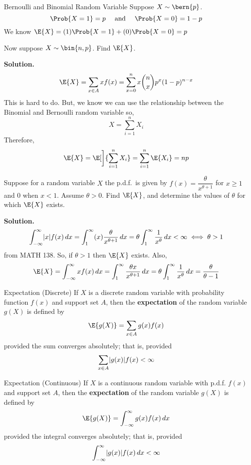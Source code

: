 \begin{Example}{Bernoulli and Binomial Random Variable}{}
    Suppose $ X \sim \bern{p} $.
    \[ \Prob{X=1}=p\quad\text{ and }\quad \Prob{X=0}=1-p \]
    We know $ \E{X}=(1)\Prob{X=1}+(0)\Prob{X=0}=p $

    Now suppose
    $ X \sim \bin{n,p} $. Find $ \E{X} $.

    \textbf{Solution.}
    \[ \E{X}=\sum\limits_{x\in A}x f(x)=\sum\limits_{x=0}^{n} x
        \binom{n}{x}p^x(1-p)^{n-x}  \]
    This is hard to do. But, we know we can use the
    relationship between the Binomial and Bernoulli random variable
    so,
    \[ X=\sum\limits_{i=1}^{n} X_i \]
    Therefore,
    \[ \E{X}=\E[\bigg]{\sum\limits_{i=1}^{n} X_i}=\sum\limits_{i=1}^{n}
        \E{X_i}=np \]
\end{Example}
\begin{Example}{}{}
    Suppose for a random variable $ X $ the p.d.f.\ is given by
    $ f(x)=\dfrac{\theta}{x^{\theta+1}} $
    for $ x\ge 1 $ and $ 0 $ when $ x<1 $. Assume $ \theta>0 $.
    Find $ \E{X} $, and determine the values of $ \theta $
    for which $ \E{X} $ exists.

    \textbf{Solution.}
    \[ \int_{-\infty}^{\infty} \lvert x\rvert f(x)\, d{x}=
        \int_{1}^{\infty} (x) \frac{\theta}{x^{\theta+1}} \, d{x}
        =\theta \int_{1}^{\infty} \frac{1}{x^{\theta}} \, d{x} <\infty
        \iff \theta>1 \]
    from MATH 138. So, if $ \theta>1 $ then $ \E{X} $ exists. Also,
    \[ \E{X}=\int_{-\infty}^{\infty} xf(x)\, d{x}=
        \int_{1}^{\infty} \frac{\theta x}{x^{\theta+1}} \, d{x}
        =\theta \int_{1}^{\infty} \frac{1}{x^{\theta}} \, d{x}
        =\frac{\theta}{\theta-1}   \]

\end{Example}

\begin{Definition}{Expectation (Discrete)}{}
    If $ X $ is a discrete random variable with probability
    function $ f(x) $ and support set $ A $,
    then the \textbf{expectation} of the random variable $ g(X) $
    is defined by
    \[ \E{g(X)}=\sum\limits_{x\in A}g(x)f(x) \]
    provided the sum converges absolutely; that is, provided
    \[ \sum\limits_{x\in A}\lvert g(x)\rvert f(x)<\infty \]
\end{Definition}

\begin{Definition}{Expectation (Continuous)}{}
    If $ X $ is a continuous random variable with p.d.f.
    $ f(x) $ and support set $ A $,
    then the \textbf{expectation} of the random variable $ g(X) $
    is defined by
    \[ \E{g(X)}=\int_{-\infty}^{\infty} g(x)f(x)\, d{x} \]
    provided the integral converges absolutely; that is, provided
    \[ \int_{-\infty}^{\infty} \lvert g(x)\rvert f(x)\, d{x} <\infty \]
\end{Definition}

